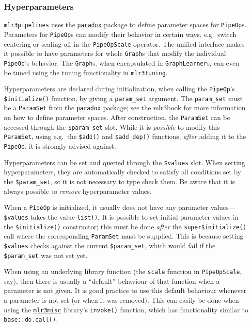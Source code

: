 \documentclass[]{article}
\begin{document}
\hypertarget{ext-pipe-hyperpars}{%
\subsubsection{Hyperparameters}\label{ext-pipe-hyperpars}}

\texttt{mlr3pipelines} uses the \href{https://paradox.mlr-org.com}{\texttt{paradox}} package to define parameter spaces for \texttt{PipeOp}s.
Parameters for \texttt{PipeOp}s can modify their behavior in certain ways, e.g.~switch centering or scaling off in the \texttt{PipeOpScale} operator.
The unified interface makes it possible to have parameters for whole \texttt{Graph}s that modify the individual \texttt{PipeOp}'s behavior.
The \texttt{Graph}s, when encapsulated in \texttt{GraphLearner}s, can even be tuned using the tuning functionality in \href{https://github.com/mlr-org/mlr3tuning}{\texttt{mlr3tuning}}.

Hyperparameters are declared during initialization, when calling the \texttt{PipeOp}'s \texttt{\$initialize()} function, by giving a \texttt{param\_set} argument.
The \texttt{param\_set} must be a \texttt{ParamSet} from the \texttt{paradox} package; see the \href{https://mlr3book.mlr-org.com}{mlr3book} for more information on how to define parameter spaces.
After construction, the \texttt{ParamSet} can be accessed through the \texttt{\$param\_set} slot.
While it is \emph{possible} to modify this \texttt{ParamSet}, using e.g.~the \texttt{\$add()} and \texttt{\$add\_dep()} functions, \emph{after} adding it to the \texttt{PipeOp}, it is strongly advised against.

Hyperparameters can be set and queried through the \texttt{\$values} slot.
When setting hyperparameters, they are automatically checked to satisfy all conditions set by the \texttt{\$param\_set}, so it is not necessary to type check them.
Be aware that it is always possible to \emph{remove} hyperparameter values.

When a \texttt{PipeOp} is initialized, it usually does not have any parameter values---\texttt{\$values} takes the value \texttt{list()}.
It is possible to set initial parameter values in the \texttt{\$initialize()} constructor; this must be done \emph{after} the \texttt{super\$initialize()} call where the corresponding \texttt{ParamSet} must be supplied.
This is because setting \texttt{\$values} checks against the current \texttt{\$param\_set}, which would fail if the \texttt{\$param\_set} was not set yet.

When using an underlying library function (the \texttt{scale} function in \texttt{PipeOpScale}, say), then there is usually a ``default'' behaviour of that function when a parameter is not given.
It is good practice to use this default behaviour whenever a parameter is not set (or when it was removed).
This can easily be done when using the \href{https://github.com/mlr-org/mlr3misc}{\texttt{mlr3misc}} library's \texttt{invoke()} function, which has functionality similar to \texttt{base::do.call()}.
\end{document}
